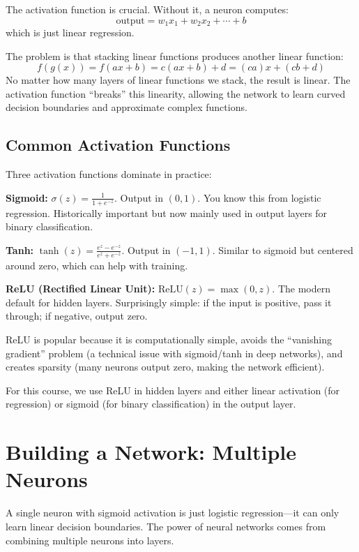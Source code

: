 \documentclass[11pt,a4paper]{article}
\begin{document}
The activation function is crucial. Without it, a neuron computes:
\[
\text{output} = w_1 x_1 + w_2 x_2 + \cdots + b
\]
which is just linear regression.

The problem is that stacking linear functions produces another linear function:
\[
f(g(x)) = f(ax + b) = c(ax + b) + d = (ca)x + (cb + d)
\]
No matter how many layers of linear functions we stack, the result is linear. The activation function ``breaks'' this linearity, allowing the network to learn curved decision boundaries and approximate complex functions.

\subsection{Common Activation Functions}

Three activation functions dominate in practice:

\textbf{Sigmoid:} $\sigma(z) = \frac{1}{1 + e^{-z}}$. Output in $(0, 1)$. You know this from logistic regression. Historically important but now mainly used in output layers for binary classification.

\textbf{Tanh:} $\tanh(z) = \frac{e^z - e^{-z}}{e^z + e^{-z}}$. Output in $(-1, 1)$. Similar to sigmoid but centered around zero, which can help with training.

\textbf{ReLU (Rectified Linear Unit):} $\text{ReLU}(z) = \max(0, z)$. The modern default for hidden layers. Surprisingly simple: if the input is positive, pass it through; if negative, output zero.

ReLU is popular because it is computationally simple, avoids the ``vanishing gradient'' problem (a technical issue with sigmoid/tanh in deep networks), and creates sparsity (many neurons output zero, making the network efficient).

For this course, we use ReLU in hidden layers and either linear activation (for regression) or sigmoid (for binary classification) in the output layer.

\section{Building a Network: Multiple Neurons}

A single neuron with sigmoid activation is just logistic regression---it can only learn linear decision boundaries. The power of neural networks comes from combining multiple neurons into layers.
\end{document}
